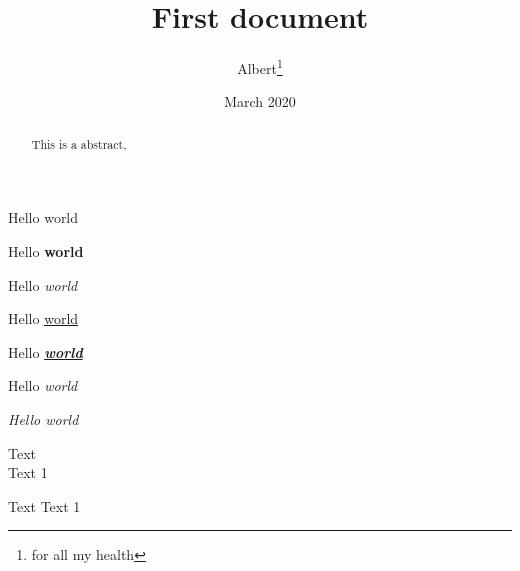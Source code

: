 \documentclass[12pt, a4paper]{article}
\title{First document}
\author{Albert\thanks{for all my health}}
\date{March 2020}
\begin{document}
\maketitle
Hello world

Hello \textbf{world}

Hello \textit{world}

Hello \underline{world}

Hello \underline{\textit{\textbf{world}}}

Hello \emph{world}

\textit{Hello \emph{world}}

\begin{abstract}
This is a abstract, \blindtext
\end{abstract}

Text \\ Text 1

Text \newline Text 1
\end{document}
